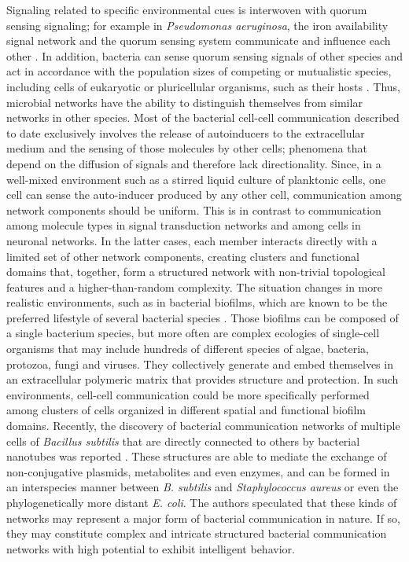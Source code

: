 Signaling related to specific environmental cues is interwoven with quorum sensing signaling; for example in \textit{Pseudomonas aeruginosa}, the iron availability signal network and the quorum sensing system communicate and influence each other \cite{juhas_global_2004}. In addition, bacteria can sense quorum sensing signals of other species \cite{federle_autoinducer-2-based_2009} and act in accordance with the population sizes of competing or mutualistic species, including cells of eukaryotic or pluricellular organisms, such as their hosts \cite{bansal_bacterial_2010,hosni_sharing_2011,ma_proteus_2012}. Thus, microbial networks have the ability to distinguish themselves from similar networks in other species. Most of the bacterial cell-cell communication described to date exclusively involves the release of autoinducers to the extracellular medium and the sensing of those molecules by other cells; phenomena that depend on the diffusion of signals and therefore lack directionality. Since, in a well-mixed environment such as a stirred liquid culture of planktonic cells, one cell can sense the auto-inducer produced by any other cell, communication among network components should be uniform. This is in contrast to communication among molecule types in signal transduction networks and among cells in neuronal networks. In the latter cases, each member interacts directly with a limited set of other network components, creating clusters and functional domains that, together, form a structured network with non-trivial topological features and a higher-than-random complexity. The situation changes in more realistic environments, such as in bacterial biofilms, which are known to be the preferred lifestyle of several bacterial species \cite{costerton_microbial_1995}. Those biofilms can be composed of a single bacterium species, but more often are complex ecologies of single-cell organisms that may include hundreds of different species of algae, bacteria, protozoa, fungi and viruses. They collectively generate and embed themselves in an extracellular polymeric matrix that provides structure and protection. In such environments, cell-cell communication could be more specifically performed among clusters of cells organized in different spatial and functional biofilm domains. Recently, the discovery of bacterial communication networks of multiple cells of \textit{Bacillus subtilis} that are directly connected to others by bacterial nanotubes was reported \cite{dubey_intercellular_2011}. These structures are able to mediate the exchange of non-conjugative plasmids, metabolites and even enzymes, and can be formed in an interspecies manner between \textit{B. subtilis} and \textit{Staphylococcus aureus} or even the phylogenetically more distant \textit{E. coli}. The authors speculated that these kinds of networks may represent a major form of bacterial communication in nature. If so, they may constitute complex and intricate structured bacterial communication networks with high potential to exhibit intelligent behavior.

